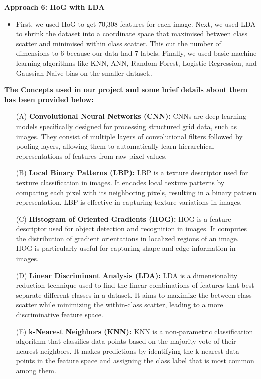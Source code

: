 \documentclass[a4paper]{article}
\theoremstyle{plain}
\theoremstyle{definition}
\begin{document}
 \textbf{Approach 6: HoG with LDA}\vspace{3pt}
 \begin{itemize}
 \item First, we used HoG to get 70,308 features for each image. Next, we used LDA to shrink the dataset into a coordinate space that maximised between class scatter and minimised within class scatter. This cut the number of dimensions to 6 because our data had 7 labels. Finally, we used basic machine learning algorithms like KNN, ANN, Random Forest, Logistic Regression, and Gaussian Naive bias on the smaller dataset..
 \end{itemize}
\textbf{The Concepts used in our project and some brief details about them has been provided below:}
	\begin{enumerate}
\item[(A)] \textbf {Convolutional Neural Networks (CNN):}
CNNs are deep learning models specifically designed for processing structured grid data, such as images. They consist of multiple layers of convolutional filters followed by pooling layers, allowing them to automatically learn hierarchical representations of features from raw pixel values.
\item[(B)] \textbf{Local Binary Patterns (LBP):}
LBP is a texture descriptor used for texture classification in images. It encodes local texture patterns by comparing each pixel with its neighboring pixels, resulting in a binary pattern representation. LBP is effective in capturing texture variations in images.
\item[(C)] \textbf{Histogram of Oriented Gradients (HOG):}
HOG is a feature descriptor used for object detection and recognition in images. It computes the distribution of gradient orientations in localized regions of an image. HOG is particularly useful for capturing shape and edge information in images.
\item[(D)] \textbf{Linear Discriminant Analysis (LDA):}
LDA is a dimensionality reduction technique used to find the linear combinations of features that best separate different classes in a dataset. It aims to maximize the between-class scatter while minimizing the within-class scatter, leading to a more discriminative feature space.
\item[(E)] \textbf{k-Nearest Neighbors (KNN):}
KNN is a non-parametric classification algorithm that classifies data points based on the majority vote of their nearest neighbors. It makes predictions by identifying the k nearest data points in the feature space and assigning the class label that is most common among them.

\end{enumerate}
\end{document}
